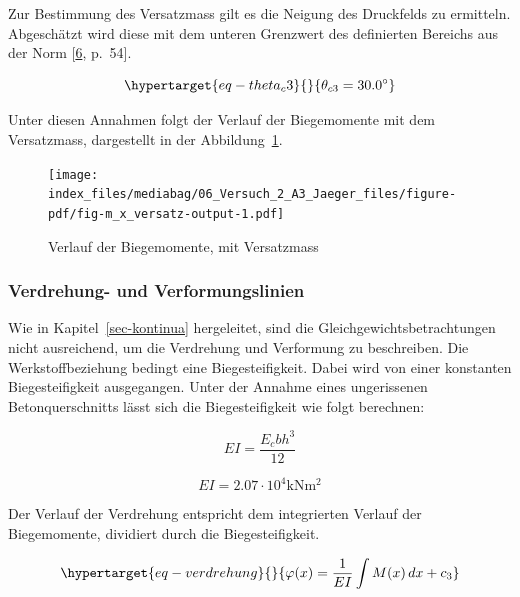 \documentclass[
  12pt,
  letterpaper,
  egregdoesnotlikesansseriftitles]{scrreprt}
\begin{document}
Zur Bestimmung des Versatzmass gilt es die Neigung des Druckfelds zu
ermitteln. Abgeschätzt wird diese mit dem unteren Grenzwert des
definierten Bereichs aus der Norm
{[}\protect\hyperlink{ref-SIA2013a}{6}, p.~54{]}.

\begin{equation}\protect\hypertarget{eq-theta_c3}{}{
 \theta_{c3} = 30.0^{\circ} 
}\label{eq-theta_c3}\end{equation}

Unter diesen Annahmen folgt der Verlauf der Biegemomente mit dem
Versatzmass, dargestellt in der Abbildung~\ref{fig-m_x_versatz}.

\begin{figure}[H]

{\centering \texttt{[image: index\_files/mediabag/06\_Versuch\_2\_A3\_Jaeger\_files/figure-pdf/fig-m\_x\_versatz-output-1.pdf]}

}

\caption{\label{fig-m_x_versatz}Verlauf der Biegemomente, mit
Versatzmass}

\end{figure}

\hypertarget{verdrehung--und-verformungslinien}{%
\subsubsection{Verdrehung- und
Verformungslinien}\label{verdrehung--und-verformungslinien}}

Wie in Kapitel~\ref{sec-kontinua} hergeleitet, sind die
Gleichgewichtsbetrachtungen nicht ausreichend, um die Verdrehung und
Verformung zu beschreiben. Die Werkstoffbeziehung bedingt eine
Biegesteifigkeit. Dabei wird von einer konstanten Biegesteifigkeit
ausgegangen. Unter der Annahme eines ungerissenen Betonquerschnitts
lässt sich die Biegesteifigkeit wie folgt berechnen:

\begin{equation}EI = \frac{E_{c} b h^{3}}{12}\end{equation}

\begin{equation}EI = 2.07 \cdot 10^{4} \text{kN} \text{m}^{2}\end{equation}

Der Verlauf der Verdrehung entspricht dem integrierten Verlauf der
Biegemomente, dividiert durch die Biegesteifigkeit.

\begin{equation}\protect\hypertarget{eq-verdrehung}{}{
\varphi(x) = \frac{1}{EI}\int M(x) \, dx + c_3
}\label{eq-verdrehung}\end{equation}
\end{document}

